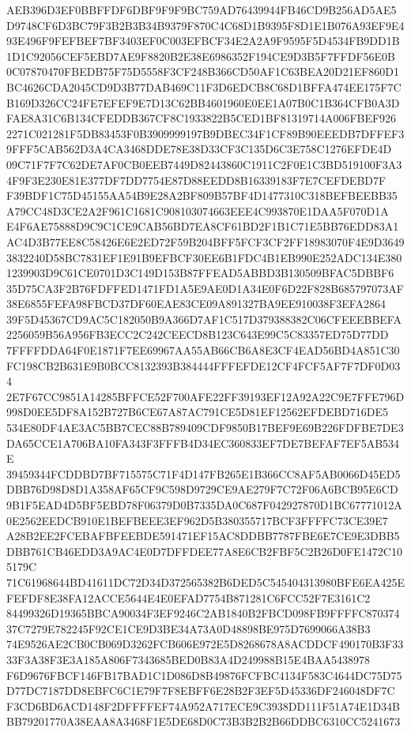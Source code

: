 \documentclass[UTF8,fontset=fandol,zihao=-4,a4paper]{ctexart}
\begin{document}
{{AEB396D3EF0BBFFDF6DBF9F9F9BC759AD76439944FB46CD9B256AD5AE5D9748CF6D3BC79F3B2B3B34B9379F870C4C68D1B9395F8D1E1B076A93EF9E4
93E496F9FEFBEF7BF3403EF0C003EFBCF34E2A2A9F9595F5D4534FB9DD1B1D1C92056CEF5EBD7AE9F8820B2E38E6986352F194CE9D3B5F7FFDF56E0B
0C07870470FBEDB75F75D5558F3CF248B366CD50AF1C63BEA20D21EF860D1BC4626CDA2045CD9D3B77DAB469C11F3D6EDCB8C68D1BFFA474EE175F7C
B169D326CC24FE7EFEF9E7D13C62BB4601960E0EE1A07B0C1B364CFB0A3DFAE8A31C6B134CFEDDB367CF8C1933822B5CED1BF81319714A006FBEF926
2271C021281F5DB83453F0B3909999197B9DBEC34F1CF89B90EEEDB7DFFEF39FFF5CAB562D3A4CA3468DDE78E38D33CF3C135D6C3E758C1276EFDE4D
09C71F7F7C62DE7AF0CB0EEB7449D82443860C1911C2F0E1C3BD519100F3A34F9F3E230E81E377DF7DD7754E87D88EEDD8B16339183F7E7CEFDEBD7F
F39BDF1C75D45155AA54B9E28A2BF809B57BF4D1477310C318BEFBEEBB35A79CC48D3CE2A2F961C1681C908103074663EEE4C993870E1DAA5F070D1A
E4F6AE75888D9C9C1CE9CAB56BD7EA8CF61BD2F1B1C71E5BB76EDD83A1AC4D3B77EE8C58426E6E2ED72F59B204BFF5FCF3CF2FF18983070F4E9D3649
3832240D58BC7831EF1E91B9EFBCF30EE6B1FDC4B1EB990E252ADC134E3801239903D9C61CE0701D3C149D153B87FFEAD5ABBD3B130509BFAC5DBBF6
35D75CA3F2B76FDFFED1471FD1A5E9AE0D1A34E0F6D22F828B685797073AF38E6855FEFA98FBCD37DF60EAE83CE09A891327BA9EE910038F3EFA2864
39F5D45367CD9AC5C182050B9A366D7AF1C517D379388382C06CFEEEBBEFA2256059B56A956FB3ECC2C242CEECD8B123C643E99C5C83357ED75D77DD
7FFFFDDA64F0E1871F7EE69967AA55AB66CB6A8E3CF4EAD56BD4A851C30FC198CB2B631E9B0BCC8132393B384444FFFEFDE12CF4FCF5AF7F7DF0D034
2E7F67CC9851A14285BFFCE52F700AFE22FF39193EF12A92A22C9E7FFE796D998D0EE5DF8A152B727B6CE67A87AC791CE5D81EF12562EFDEBD716DE5
534E80DF4AE3AC5BB7CEC88B789409CDF9850B17BEF9E69B226FDFBE7DE3DA65CCE1A706BA10FA343F3FFFB4D34EC360833EF7DE7BEFAF7EF5AB534E
39459344FCDDBD7BF715575C71F4D147FB265E1B366CC8AF5AB0066D45ED5DBB76D98D8D1A358AF65CF9C598D9729CE9AE279F7C72F06A6BCB95E6CD
9B1F5EAD4D5BF5EBD78F06379D0B7335DA0C687F042927870D1BC67771012A0E2562EEDCB910E1BEFBEEE3EF962D5B380355717BCF3FFFFC73CE39E7
A28B2EE2FCEBAFBFEEBDE591471EF15AC8DDBB7787FBE6E7CE9E3DBB5DBB761CB46EDD3A9AC4E0D7DFFDEE77A8E6CB2FBF5C2B26D0FE1472C105179C
71C61968644BD41611DC72D34D372565382B6DED5C545404313980BFE6EA425EFEFDF8E38FA12ACCE5644E4E0EFAD7754B871281C6FCC52F7E3161C2
84499326D19365BBCA90034F3EF9246C2AB1840B2FBCD098FB9FFFFC87037437C7279E782245F92CE1CE9D3BE34A73A0D48898BE975D7699066A38B3
74E9526AE2CB0CB069D3262FCB606E972E5D8268678A8ACDDCF490170B3F3333F3A38F3E3A185A806F7343685BED0B83A4D249988B15E4BAA5438978
F6D9676FBCF146FB17BAD1C1D086D8B49876FCFBC4134F583C4644DC75D75D77DC7187DD8EBFC6C1E79F7F8EBFF6E28B2F3EF5D45336DF246048DF7C
F3CD6BD6ACD148F2DFFFFEF74A952A717ECE9C3938DD111F51A74E1D34BBB79201770A38EAA8A3468F1E5DE68D0C73B3B2B2B66DDBC6310CC5241673
}}
\end{document}
